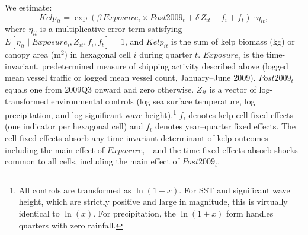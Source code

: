 \documentclass[12pt]{article}
\begin{document}
We estimate:
\begin{equation}
Kelp_{it}=\exp\!\left(\beta\,Exposure_{i}\times \mathit{Post2009}_{t}+\delta\,Z_{it}+f_{i}+f_{t}\right)\cdot\eta_{it},
\label{eq:cdid}
\end{equation}
where $\eta_{it}$ is a multiplicative error term satisfying $E[\eta_{it}\mid Exposure_{i},Z_{it},f_{i},f_{t}]=1$, and $Kelp_{it}$ is the sum of kelp biomass (kg) or canopy area (m$^{2}$) in hexagonal cell $i$ during quarter $t$. $Exposure_{i}$ is the time-invariant, predetermined measure of shipping activity described above (logged mean vessel traffic or logged mean vessel count, January--June 2009). $\mathit{Post2009}_{t}$ equals one from 2009Q3 onward and zero otherwise. $Z_{it}$ is a vector of log-transformed environmental controls (log sea surface temperature, log precipitation, and log significant wave height).\footnote{All controls are transformed as $\ln(1+x)$. For SST and significant wave height, which are strictly positive and large in magnitude, this is virtually identical to $\ln(x)$. For precipitation, the $\ln(1+x)$ form handles quarters with zero rainfall.} $f_{i}$ denotes kelp-cell fixed effects (one indicator per hexagonal cell) and $f_{t}$ denotes year--quarter fixed effects. The cell fixed effects absorb any time-invariant determinant of kelp outcomes---including the main effect of $Exposure_{i}$---and the time fixed effects absorb shocks common to all cells, including the main effect of $\mathit{Post2009}_{t}$.
\end{document}
